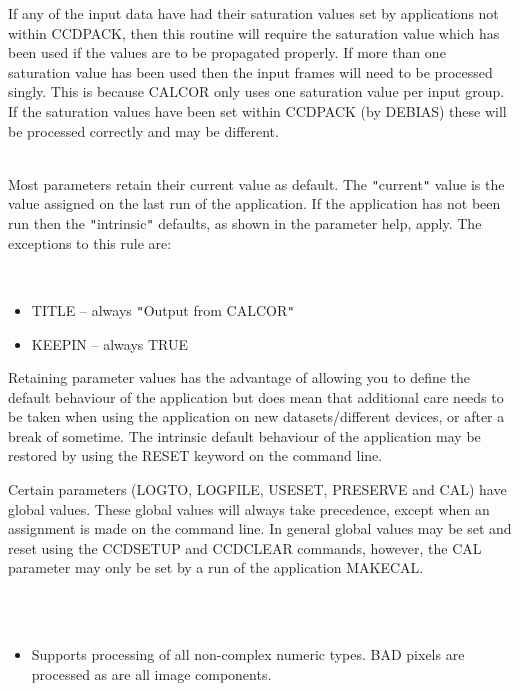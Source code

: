 \documentclass[twoside,11pt]{article}
\newcommand{\htmlref}[2]{#1}
\renewcommand{\_}{\texttt{\symbol{95}}}
\newcommand{\qt}[1]{{\tt "}#1{\tt "}}
\newcommand{\routine}[1]{{\sc #1}}
\newcommand{\xroutine}[1]{\htmlref{{\sc #1}}{#1}}
\newcommand{\sstdiytopic}[2]{\item[#1:] \mbox{} \\[1.3ex] #2}
\newcommand{\sstimplementationstatus}[1]{
   \item[{Implementation Status:}] \mbox{} \\[1.3ex] #1}
\newcommand{\sstitemlist}[1]{
  \mbox{} \\
  \vspace{-3.5ex}
  \begin{itemize}
     #1
  \end{itemize}
}
\newcommand{\sstitem}{\item}
\newcommand{\sstdiytopic}[2]{\item[{#1:}] #2 }
\newcommand{\sstimplementationstatus}[1]{
      \item[Implementation Status:] #1
   }
\newcommand{\sstitemlist}[1]{
      \begin{itemize}
         #1
      \end{itemize}
      \\
   }
\newcommand{\sstitem}{\item}
\begin{document}
{{{         \sstitem
         If any of the input data have had their saturation values set
           by applications not within CCDPACK, then this routine will
           require the saturation value which has been used if the values
           are to be propagated properly. If more than one saturation
           value has been used then the input frames will need to be
           processed singly. This is because \routine{CALCOR} only uses one
           saturation value per input group. If the saturation values
           have been set within CCDPACK (by \xroutine{DEBIAS}) these will be
           processed correctly and may be different.
      }
   }
   \sstdiytopic{
      Behaviour of parameters
   } {
      Most parameters retain their current value as default. The
      \qt{current} value is the value assigned on the last run of the
      application. If the application has not been run then the
      \qt{intrinsic} defaults, as shown in the parameter help, apply.
      The exceptions to this rule are:
      \sstitemlist{

         \sstitem
            TITLE   -- always \qt{Output from CALCOR}

         \sstitem
            KEEPIN  -- always TRUE

      }
      Retaining parameter values has the advantage of allowing you to
      define the default behaviour of the application but does mean
      that additional care needs to be taken when using the application
      on new datasets/different devices, or after a break of sometime.
      The intrinsic default behaviour of the application may be
      restored by using the RESET keyword on the command line.

      Certain parameters (LOGTO, LOGFILE, USESET, PRESERVE and CAL) have
      global values. These global values will always take precedence,
      except when an assignment is made on the command line.  In general
      global values may be set and reset using the \xroutine{CCDSETUP} and
      \xroutine{CCDCLEAR} commands, however, the CAL parameter may only be set by
      a run of the application \xroutine{MAKECAL}.
   }
   \sstimplementationstatus{
      \sstitemlist{

         \sstitem
         Supports processing of all non-complex numeric types.
           BAD pixels are processed as are all image components.
      }
   }
}
\end{document}
